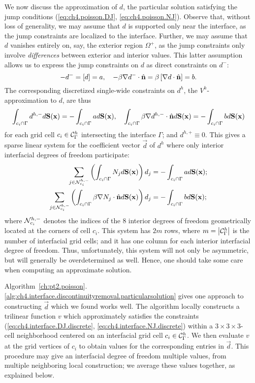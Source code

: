 We now discuss the approximation of $d$, the particular solution satisfying the jump conditions (\ref{eq:ch4.poisson.DJ}, \ref{eq:ch4.poisson.NJ}). Observe that, without loss of generality, we may assume that $d$ is supported only near the interface, as the jump constraints are localized to the interface. Further, we may assume that $d$ vanishes entirely on, say, the exterior region $\Omega^+$, as the jump constraints only involve \emph{differences} between exterior and interior values. This latter assumption allows us to express the jump constraints on $d$ as direct constraints on $d^-$:
\begin{equation*}
-d^- = \left[ d \right] = a, \quad -\beta \nabla d^- \cdot \hat{\mathbf{n}} = \beta \left[ \nabla d \cdot \hat{\mathbf{n}} \right] = b.
\end{equation*}
The corresponding discretized single-wide constraints on $d^h$, the $V^h$-approximation to $d$, are thus
\begin{equation*}
\int_{c_i \cap \Gamma} d^{h,-} d\mathbf{S}(\mathbf{x}) = -\int_{c_i \cap \Gamma} a d\mathbf{S}(\mathbf{x}), \quad
\int_{c_i \cap \Gamma} \beta \nabla d^{h,-} \cdot \hat{\mathbf{n}} d\mathbf{S}(\mathbf{x}) = -\int_{c_i \cap \Gamma} b d\mathbf{S}(\mathbf{x})
\end{equation*}
for each grid cell $c_i \in \mathcal{C}_{\Gamma}^h$ intersecting the interface $\Gamma$; and $d^{h,+} \equiv 0$. This gives a sparse linear system for the coefficient vector $\vec{d}$ of $d^h$ where only interior interfacial degrees of freedom participate:
\begin{align}
\sum_{j \in \mathcal{N}^{h,-}_{c_i}} \left( \int_{c_i \cap \Gamma} N_j d\mathbf{S}(\mathbf{x}) \right) d_j & = -\int_{c_i \cap \Gamma} a d\mathbf{S}(\mathbf{x}); \label{eq:ch4.interface.DJ.discrete} \\
\sum_{j \in \mathcal{N}^{h,-}_{c_i}} \left( \int_{c_i \cap \Gamma} \beta \nabla N_j \cdot \hat{\mathbf{n}} d\mathbf{S}(\mathbf{x}) \right) d_j & = -\int_{c_i \cap \Gamma} b d\mathbf{S}(\mathbf{x}); \label{eq:ch4.interface.NJ.discrete}
\end{align}
where $\mathcal{N}^{h,-}_{c_i}$ denotes the indices of the $8$ interior degrees of freedom geometrically located at the corners of cell $c_i$. This system has $2m$ rows, where $m = \left\lvert \mathcal{C}_{\Gamma}^h \right\rvert$ is the number of interfacial grid cells; and it has one column for each interior interfacial degree of freedom. Thus, unfortunately, this system will not only be asymmetric, but will generally be overdetermined as well. Hence, one should take some care when computing an approximate solution.

Algorithm~\ref{ch:pt2.poisson}.\ref{alg:ch4.interface.discontinuityremoval.particularsolution} gives one approach to constructing $\vec{d}$ which we found works well. The algorithm locally constructs a trilinear function $v$ which approximately satisfies the constraints (\ref{eq:ch4.interface.DJ.discrete}, \ref{eq:ch4.interface.NJ.discrete}) within a $3 \times 3 \times 3$-cell neighborhood centered on an interfacial grid cell $c_i \in \mathcal{C}_{\Gamma}^h$. We then evaluate $v$ at the grid vertices of $c_i$ to obtain values for the corresponding entries in $\vec{d}$. This procedure may give an interfacial degree of freedom multiple values, from multiple neighboring local construction; we average these values together, as explained below.

